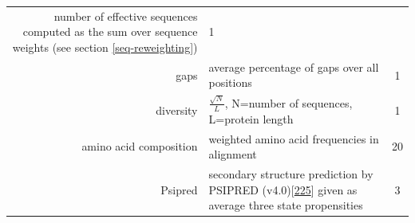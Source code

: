 \documentclass[11pt,a4paper,twoside]{book}
\theoremstyle{definition}
\theoremstyle{definition}
\theoremstyle{remark}
\begin{document}
\begin{longtable}[]{@{}rlc@{}}
\begin{minipage}[t]{0.50\columnwidth}
number of effective sequences computed as the sum over sequence weights
(see section \ref{seq-reweighting})\strut
\end{minipage} & \begin{minipage}[t]{0.18\columnwidth}\centering\strut
1\strut
\end{minipage}\tabularnewline
\begin{minipage}[t]{0.23\columnwidth}\raggedleft\strut
gaps\strut
\end{minipage} & \begin{minipage}[t]{0.50\columnwidth}\raggedright\strut
average percentage of gaps over all positions\strut
\end{minipage} & \begin{minipage}[t]{0.18\columnwidth}\centering\strut
1\strut
\end{minipage}\tabularnewline
\begin{minipage}[t]{0.23\columnwidth}\raggedleft\strut
diversity\strut
\end{minipage} & \begin{minipage}[t]{0.50\columnwidth}\raggedright\strut
\(\frac{\sqrt{N}}{L}\), N=number of sequences, L=protein length\strut
\end{minipage} & \begin{minipage}[t]{0.18\columnwidth}\centering\strut
1\strut
\end{minipage}\tabularnewline
\begin{minipage}[t]{0.23\columnwidth}\raggedleft\strut
amino acid composition\strut
\end{minipage} & \begin{minipage}[t]{0.50\columnwidth}\raggedright\strut
weighted amino acid frequencies in alignment\strut
\end{minipage} & \begin{minipage}[t]{0.18\columnwidth}\centering\strut
20\strut
\end{minipage}\tabularnewline
\begin{minipage}[t]{0.23\columnwidth}\raggedleft\strut
Psipred\strut
\end{minipage} & \begin{minipage}[t]{0.50\columnwidth}\raggedright\strut
secondary structure prediction by PSIPRED
(v4.0){[}\protect\hyperlink{ref-Jones1999}{225}{]} given as average
three state propensities\strut
\end{minipage} & \begin{minipage}[t]{0.18\columnwidth}\centering\strut
3\strut
\end{minipage}\tabularnewline

\end{longtable}
\end{document}
